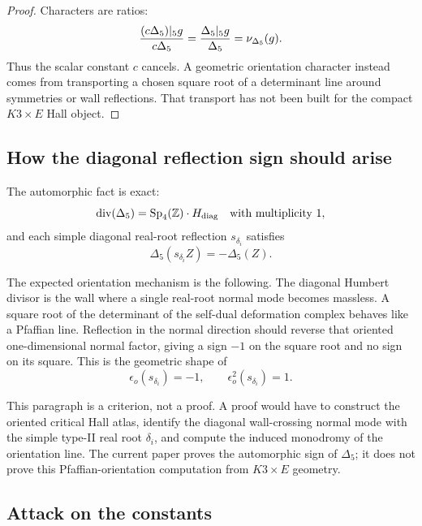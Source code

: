 \begin{proof}
Characters are ratios:
\[
  \frac{(c\Delta_5)|_5g}{c\Delta_5}
  =
  \frac{\Delta_5|_5g}{\Delta_5}
  =
  \nu_{\Delta_5}(g).
\]
Thus the scalar constant \(c\) cancels.  A geometric orientation
character instead comes from transporting a chosen square root of a
determinant line around symmetries or wall reflections.  That
transport has not been built for the compact \(K3\times E\) Hall object.
\end{proof}

\subsection{How the diagonal reflection sign should arise}

The automorphic fact is exact:
\[
  \operatorname{div}(\Delta_5)
  =
  \operatorname{Sp}_4(\mathbb Z)\cdot H_{\mathrm{diag}}
  \quad\text{with multiplicity }1,
\]
and each simple diagonal real-root reflection \(s_{\delta_i}\) satisfies
\[
  \Delta_5(s_{\delta_i}Z)=-\Delta_5(Z).
\]

The expected orientation mechanism is the following.  The diagonal
Humbert divisor is the wall where a single real-root normal mode becomes
massless.  A square root of the determinant of the self-dual deformation
complex behaves like a Pfaffian line.  Reflection in the normal direction
should reverse that oriented one-dimensional normal factor, giving a
sign \(-1\) on the square root and no sign on its square.  This is the
geometric shape of
\[
  \epsilon_o(s_{\delta_i})=-1,
  \qquad
  \epsilon_o^2(s_{\delta_i})=1.
\]

This paragraph is a criterion, not a proof.  A proof would have to
construct the oriented critical Hall atlas, identify the diagonal
wall-crossing normal mode with the simple type-II real root
\(\delta_i\), and compute the induced monodromy of the orientation line.
The current paper proves the automorphic sign of \(\Delta_5\); it does
not prove this Pfaffian-orientation computation from \(K3\times E\)
geometry.

\subsection{Attack on the constants}

